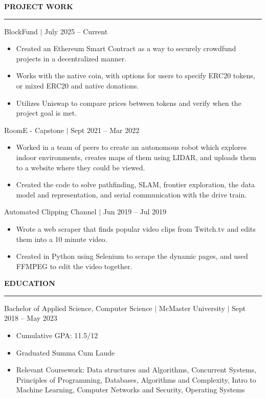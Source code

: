 \documentclass[12pt]{article}
\newcommand{\sectionRule}{\textcolor{gray}{\rule{7.27in}{0.02cm}}}
\newcommand{\sectionTxt}[1]{\noindent\textbf{#1}\\}
\newcommand{\textDate}[3]{\noindent#1 $|$ #2 $|$ {\color{textGray} #3}}
\newcommand{\projText}[2]{\noindent#1 $|$ {\color{textGray} #2}}
\begin{document}
    \newpage

    \sectionTxt{PROJECT WORK}
    \sectionRule
    
    \projText{BlockFund}{July 2025 -- Current}
    \begin{small}
        \begin{itemize}
            \itemsep0em 
            \item {Created an Ethereum Smart Contract as a way to securely crowdfund projects in a decentralized manner.}
            \item {Works with the native coin, with options for users to specify ERC20 tokens, or mixed ERC20 and native donations.}
            \item {Utilizes Uniswap to compare prices between tokens and verify when the project goal is met.}
        \end{itemize}
    \end{small}

    \projText{RoomE - Capstone}{Sept 2021 -- Mar 2022}
    \begin{small}
        \begin{itemize}
            \itemsep0em 
            \item {Worked in a team of peers to create an autonomous robot which explores indoor environments, creates maps of them using LIDAR, and uploads them to a website where they could be viewed.}
            \item {Created the code to solve pathfinding, SLAM, frontier exploration, the data model and representation, and serial communication with the drive train. }
        \end{itemize}
    \end{small}

    \projText{Automated Clipping Channel}{Jun 2019 -- Jul 2019}
    \begin{small}
        \begin{itemize}
            \itemsep0em
            \item {Wrote a web scraper that finds popular video clips from Twitch.tv and edits them into a 10 minute video.}
            \item {Created in Python using Selenium to scrape the dynamic pages, and used FFMPEG to edit the video together.}
        \end{itemize}
    \end{small}

    \sectionTxt{EDUCATION}
    \sectionRule

    \textDate{Bachelor of Applied Science, Computer Science}{McMaster University}{Sept 2018 -- May 2023}
    \begin{small}
        \begin{itemize}
            \itemsep0em 
            \item Cumulative GPA: {11.5/12}
            \item Graduated Summa Cum Laude
            \item Relevant Coursework: {Data structures and Algorithms, Concurrent Systems, Principles of Programming, Databases, Algorithms and Complexity, Intro to Machine Learning, Computer Networks and Security, Operating Systems}
        \end{itemize}
    \end{small}
\end{document}
